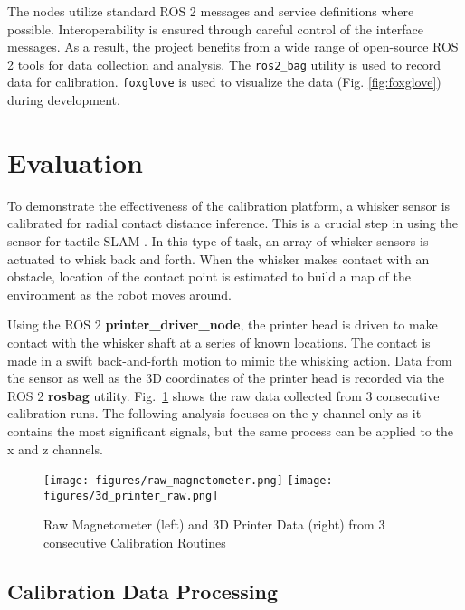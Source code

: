 \documentclass[runningheads]{llncs}
\begin{document}
The nodes utilize standard ROS 2 messages and service definitions where possible. Interoperability is ensured through careful control of the interface messages. As a result, the project benefits from a wide range of open-source ROS 2 tools for data collection and analysis. The \verb|ros2_bag| utility is used to record data for calibration. \verb|foxglove| is used to visualize the data (Fig. \ref{fig:foxglove}) during development.

\section{Evaluation}

To demonstrate the effectiveness of the calibration platform, a whisker sensor is calibrated for radial contact distance inference. This is a crucial step in using the sensor for tactile SLAM \cite{pearsonSimultaneousLocalisationMapping2013, leporaNaiveBayesNovelty2010}. In this type of task, an array of whisker sensors is actuated to whisk back and forth. When the whisker makes contact with an obstacle, location of the contact point is estimated to build a map of the environment as the robot moves around.

Using the ROS 2 \textbf{printer\_driver\_node}, the printer head is driven to make contact with the whisker shaft at a series of known locations. The contact is made in a swift back-and-forth motion to mimic the whisking action. Data from the sensor as well as the 3D coordinates of the printer head is recorded via the ROS 2 \textbf{rosbag} utility. Fig.~\ref{fig:calibration_routine} shows the raw data collected from 3 consecutive calibration runs. The following analysis focuses on the y channel only as it contains the most significant signals, but the same process can be applied to the x and z channels.

\begin{figure}
    \centering
    \texttt{[image: figures/raw\_magnetometer.png]}
    \hspace{15pt}
    \texttt{[image: figures/3d\_printer\_raw.png]}
    \caption{Raw Magnetometer (left) and 3D Printer Data (right) from 3 consecutive Calibration Routines}
    \label{fig:calibration_routine}
    \vspace{-10pt}
\end{figure}


\subsection{Calibration Data Processing}\label{sec:calibration_data_analysis}
\end{document}
